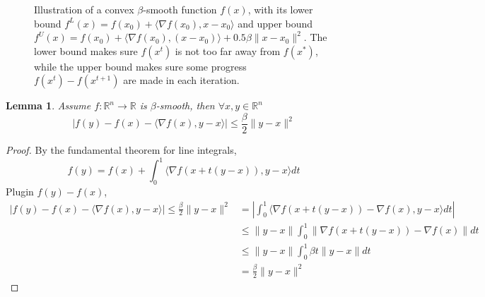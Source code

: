 \documentclass{scrartcl}
\newtheorem{lemma}{Lemma}
\newcommand{\RR}{\mathbb{R}}
\begin{document}
\begin{figure}
  \caption{Illustration of a convex $\beta$-smooth function $f(x)$, with its lower bound $f^L(x)=f
  (x_0)+\langle \nabla f(x_0),x-x_0\rangle$ and upper bound $f^U(x)=f(x_0)+\langle \nabla f(x_0),
  (x-x_0)\rangle + 0.5\beta\|x-x_0\|^2$. The lower bound makes sure $f (x^t)$ is not too far away
  from $f (x^*)$, while
  the upper bound makes sure some progress $f(x^t)-f(x^{t+1})$ are made in each iteration.}
  \label{fig:lower-and-upper-bnd-smooth-cvx}
\end{figure}

\begin{lemma}
  Assume $f:\RR^n\rightarrow \RR$ is $\beta$-smooth, then $\forall x,y\in\RR^n$
  \[
  |f(y)-f(x)- \langle \nabla f(x), y-x\rangle | \leq \frac{\beta}{2}\|y-x\|^2
  \]
\end{lemma}
\begin{proof}
By the fundamental theorem for line integrals,
\[
  f(y) = f(x) + \int_{0}^1 \langle \nabla f(x + t(y-x)), y-x\rangle dt
\]
Plugin $f(y)-f(x)$,
\[
  \begin{aligned}
  |f(y)-f(x)- \langle \nabla f(x), y-x\rangle | \leq \frac{\beta}{2}\|y-x\|^2
  &= \left| \int_0^1 \langle \nabla f(x+t(y-x))-\nabla f(x), y-x\rangle dt \right| \\
  &\leq \|y-x\|\int_0^1 \|\nabla f(x+t(y-x))-\nabla f(x)\| dt \\
  &\leq \|y-x\|\int_0^1 \beta t\|y-x\|dt \\
  &=\frac{\beta}{2}\|y-x\|^2
  \end{aligned}
\]
\end{proof}
\end{document}
